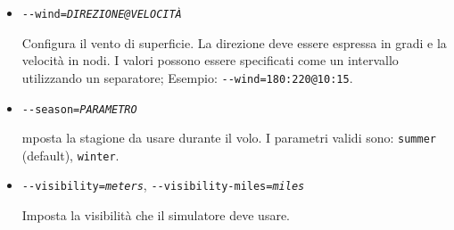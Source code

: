 {\begin{itemize}
  Imposta una turbolenza da assente (0.0) a forte (1.0).

  \item{\texttt{-$ $-wind={\it DIREZIONE@VELOCIT\`{A}}}}

  Configura il vento di superficie. La direzione deve essere espressa in gradi e la velocit\`{a} in nodi.
  I valori possono essere specificati come un intervallo utilizzando un separatore;
  Esempio: \texttt{-$ $-wind=180:220@10:15}.

  \item{\texttt{-$ $-season={\it PARAMETRO}}}

  mposta la stagione da usare durante il volo. I parametri validi sono: \texttt{summer} (default), \texttt{winter}.

  \item{\texttt{-$ $-visibility={\it meters}}, \texttt{-$ $-visibility-miles={\it miles}}}

  Imposta la visibilit\`{a} che il simulatore deve usare.

  \end{itemize}
}

